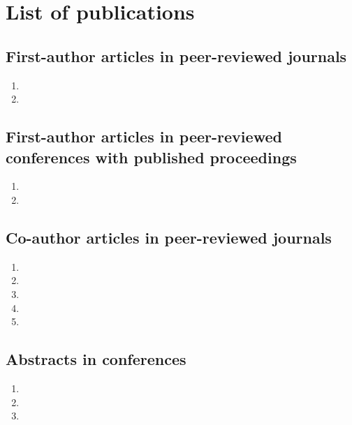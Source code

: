 \chapter{List of publications}

\doublespacing

\section*{First-author articles in peer-reviewed journals} %
\label{sec:first_author_journal_articles}
\begin{enumerate}
  \item {}
  \item {}
\end{enumerate}

\section*{First-author articles in peer-reviewed conferences with published proceedings}
\label{sec:first_author_peer_reviewed_conference_papers}
\begin{enumerate}
  \item {}
  \item {}
\end{enumerate}

\section*{Co-author articles in peer-reviewed journals} %
\label{sec:journal_articles}
\begin{enumerate}
  \item {}
  \item {}
  \item {}
  \item {}
  \item {}
\end{enumerate}

\section*{Abstracts in conferences} %
\label{sec:abstracts}
\begin{enumerate}
  \item {}
  \item {}
  \item {}
\end{enumerate}

\onehalfspacing

